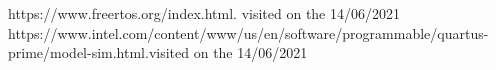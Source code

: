 \documentclass[conference]{IEEEtran}
\begin{document}
\begin{thebibliography}{00}

 https://www.freertos.org/index.html. visited on the 14/06/2021
 https://www.intel.com/content/www/us/en/software/programmable/quartus-prime/model-sim.html.visited on the 14/06/2021

\end {thebibliography}{}
\end{document}
